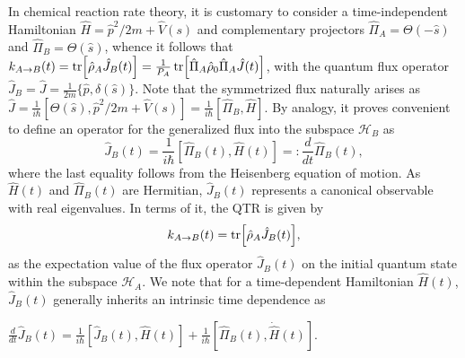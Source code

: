 \documentclass[prl,aps,amssymb,twocolumn,superscriptaddress, notitlepage, longbibliography]{revtex4-2}
\begin{document}
In chemical reaction rate theory, it is customary to consider a time-independent Hamiltonian $\hat{H}=\hat{p}^2/2m+\hat{V}(s)$ and complementary projectors $\hat{\Pi}_A=\Theta(-\hat{s})$ and $\hat{\Pi}_B=\Theta(\hat{s})$, whence it follows that
$k_{A\rightarrow B}(t)=\tr[\hat{\rho}_A\hat{J}_B(t)]=\frac{1}{P_A}\tr[\hat{\Pi}_A\hat{\rho}_0\hat{\Pi}_A \hat{J}(t)]$,
with the quantum flux operator $\hat{J}_B=\hat{J}=\frac{1}{2m}\{\hat{p},\delta(\hat{s})\}$.
Note that the symmetrized flux naturally arises as $\hat{J}=\frac{1}{i\hbar}[\Theta(\hat{s}),\hat{p}^2/2m+\hat{V}(s)]=\frac{1}{i\hbar}[\hat{\Pi}_B,\hat{H}]$.
By analogy, it proves convenient to define an operator for the generalized flux into the subspace $\mathcal{H}_B$ as
\begin{equation}
\label{GenFlux}
\hat{J}_B(t)=\frac{1}{i\hbar}[\hat{\Pi}_B(t),\hat{H}(t)]=:\frac{d}{dt}\hat{\Pi}_B(t),
\end{equation}
where the last equality follows from the Heisenberg equation of motion.
As $\hat{H}(t)$ and $\hat{\Pi}_B(t)$ are Hermitian, $\hat{J}_B(t)$ represents a canonical observable with real eigenvalues.
In terms of it, the QTR is given by
\begin{equation}
k_{A\rightarrow B}(t)=\tr[\hat{\rho}_A \hat{J}_B(t)],

\label{defkAB}
\end{equation}
as the expectation value of the flux operator $\hat{J}_B(t)$ on the initial quantum state within the subspace $\mathcal{H}_A$. We note that for a time-dependent Hamiltonian $\hat{H}(t)$,  $\hat{J}_B(t)$ generally inherits an intrinsic time dependence as


    $\frac{d}{dt}\hat{J}_B(t)=\frac{1}{i\hbar}[\hat{J}_B(t),\hat{H}(t)]+\frac{1}{i\hbar}[\hat{\Pi}_B \left( t \right),\dot{\hat{H}} \left( t \right)]$.
\end{document}
